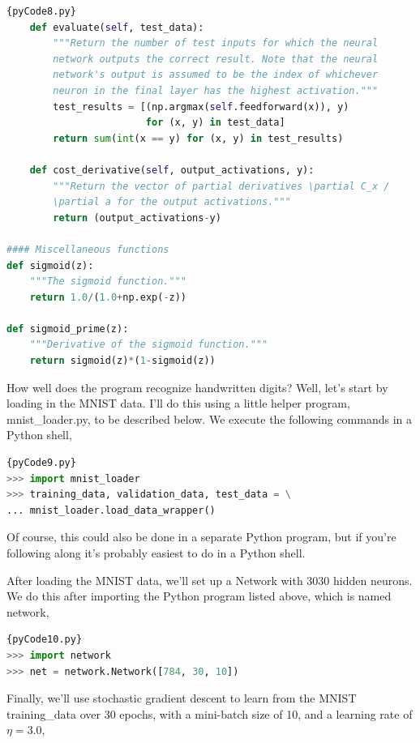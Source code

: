 \documentclass[a4paper,12pt]{report}%
\begin{document}
\begin{lstlisting}[language=Python,breaklines,basicstyle=\footnotesize\ttfamily]{pyCode8.py}
    def evaluate(self, test_data):
        """Return the number of test inputs for which the neural
        network outputs the correct result. Note that the neural
        network's output is assumed to be the index of whichever
        neuron in the final layer has the highest activation."""
        test_results = [(np.argmax(self.feedforward(x)), y)
                        for (x, y) in test_data]
        return sum(int(x == y) for (x, y) in test_results)

    def cost_derivative(self, output_activations, y):
        """Return the vector of partial derivatives \partial C_x /
        \partial a for the output activations."""
        return (output_activations-y)

#### Miscellaneous functions
def sigmoid(z):
    """The sigmoid function."""
    return 1.0/(1.0+np.exp(-z))

def sigmoid_prime(z):
    """Derivative of the sigmoid function."""
    return sigmoid(z)*(1-sigmoid(z))
\end{lstlisting}


How well does the program recognize handwritten digits? Well, let's start by loading in the MNIST data. I'll do this using a little helper program, mnist\_loader.py, to be described below. We execute the following commands in a Python shell,

\begin{lstlisting}[language=Python,breaklines,basicstyle=\footnotesize\ttfamily]{pyCode9.py}
>>> import mnist_loader
>>> training_data, validation_data, test_data = \
... mnist_loader.load_data_wrapper()
\end{lstlisting}

Of course, this could also be done in a separate Python program, but if you're following along it's probably easiest to do in a Python shell.

After loading the MNIST data, we'll set up a Network with 3030 hidden neurons. We do this after importing the Python program listed above, which is named network,

\begin{lstlisting}[language=Python,breaklines,basicstyle=\footnotesize\ttfamily]{pyCode10.py}
>>> import network
>>> net = network.Network([784, 30, 10])
\end{lstlisting}

Finally, we'll use stochastic gradient descent to learn from the MNIST training\_data over 30 epochs, with a mini-batch size of 10, and a learning rate of $\eta=3.0$,
\end{document}
